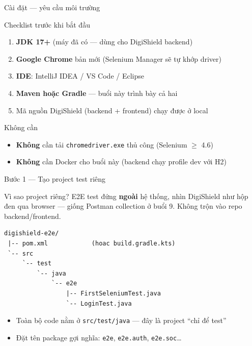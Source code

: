 \documentclass[aspectratio=169,12pt]{beamer}
\begin{document}
\begin{frame}{Cài đặt --- yêu cầu môi trường}
  \begin{block}{Checklist trước khi bắt đầu}
    \begin{enumerate}
      \item \textbf{JDK 17+} (máy đã có --- dùng cho DigiShield backend)
      \item \textbf{Google Chrome} bản mới (Selenium Manager sẽ tự khớp driver)
      \item \textbf{IDE}: IntelliJ IDEA / VS Code / Eclipse
      \item \textbf{Maven hoặc Gradle} --- buổi này trình bày cả hai
      \item Mã nguồn DigiShield (backend + frontend) chạy được ở local
    \end{enumerate}
  \end{block}

  \begin{alertblock}{Không cần}
    \begin{itemize}
      \item \textbf{Không} cần tải \texttt{chromedriver.exe} thủ công (Selenium $\geq$ 4.6)
      \item \textbf{Không} cần Docker cho buổi này (backend chạy profile dev với H2)
    \end{itemize}
  \end{alertblock}
\end{frame}

\begin{frame}[fragile]{Bước 1 --- Tạo project test riêng}
  \begin{block}{Vì sao project riêng?}
    E2E test đứng \textbf{ngoài} hệ thống, nhìn DigiShield như hộp đen qua browser
    --- giống Postman collection ở buổi 9. Không trộn vào repo backend/frontend.
  \end{block}

\begin{lstlisting}[language={}]
digishield-e2e/
 |-- pom.xml            (hoac build.gradle.kts)
 `-- src
     `-- test
         `-- java
             `-- e2e
                 |-- FirstSeleniumTest.java
                 `-- LoginTest.java
\end{lstlisting}

  \begin{itemize}
    \item Toàn bộ code nằm ở \texttt{src/test/java} --- đây là project ``chỉ để test''
    \item Đặt tên package gợi nghĩa: \texttt{e2e}, \texttt{e2e.auth}, \texttt{e2e.soc}\ldots
  \end{itemize}
\end{frame}
\end{document}
